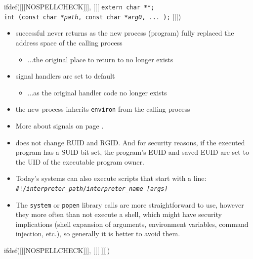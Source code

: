 \begin{slide}
ifdef([[[NOSPELLCHECK]]], [[[
\texttt{extern char **;\\
int (const char *\emph{path}, const char *\emph{arg0}, ... );}
]]])
\begin{itemize}
\item successful  never returns as the new process (program) fully
replaced the address space of the calling process
\begin{itemize}
\item ...the original place to return to no longer exists
\end{itemize}
\item signal handlers are set to default
\begin{itemize}
\item ...as the original handler code no longer exists
\end{itemize}
\item the new process inherits \texttt{environ} from the calling process
\end{itemize}
\end{slide}

\begin{itemize}
\item More about signals on page \pageref{SIGNALS}.
\item {} does not change RUID and RGID.  And for security reasons, if
the executed program has a SUID bit set, the program's EUID and saved EUID are
set to the UID of the executable program owner.
\item Today's systems can also execute scripts that start with a line:\\
\texttt{\#!/\emph{interpreter\_path}/\emph{interpreter\_name} \emph{[args]}}
\item The \texttt{system} or \texttt{popen} library calls are more
straightforward to use, however they more often than not execute a shell,
which might have security implications (shell expansion of arguments,
environment variables, command injection, etc.), so generally it is better
to avoid them.
\end{itemize}


ifdef([[[NOSPELLCHECK]]], [[[
]]])

